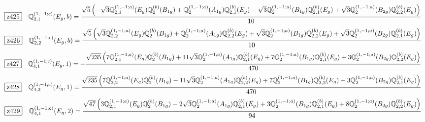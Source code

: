 \documentclass[fleqn,10pt,landscape]{jsarticle}
\begin{document}
\begin{dmath*}
\hspace*{3mm}\fbox{z425}\quad \mathbb{Q}_{2,1}^{(1,-1;c)}(E_{g},b)=\frac{\sqrt{5} \left(- \sqrt{3} \mathbb{Q}_{2,1}^{(1,-1;a)}(E_{g}) \mathbb{Q}_{2}^{(b)}(B_{1g}) + \mathbb{Q}_{2}^{(1,-1;a)}(A_{1g}) \mathbb{Q}_{2,1}^{(b)}(E_{g}) - \sqrt{3} \mathbb{Q}_{2}^{(1,-1;a)}(B_{1g}) \mathbb{Q}_{2,1}^{(b)}(E_{g}) + \sqrt{3} \mathbb{Q}_{2}^{(1,-1;a)}(B_{2g}) \mathbb{Q}_{2,2}^{(b)}(E_{g})\right)}{10}
\end{dmath*}
\begin{dmath*}
\hspace*{3mm}\fbox{z426}\quad \mathbb{Q}_{2,2}^{(1,-1;c)}(E_{g},b)=\frac{\sqrt{5} \left(\sqrt{3} \mathbb{Q}_{2,2}^{(1,-1;a)}(E_{g}) \mathbb{Q}_{2}^{(b)}(B_{1g}) + \mathbb{Q}_{2}^{(1,-1;a)}(A_{1g}) \mathbb{Q}_{2,2}^{(b)}(E_{g}) + \sqrt{3} \mathbb{Q}_{2}^{(1,-1;a)}(B_{1g}) \mathbb{Q}_{2,2}^{(b)}(E_{g}) + \sqrt{3} \mathbb{Q}_{2}^{(1,-1;a)}(B_{2g}) \mathbb{Q}_{2,1}^{(b)}(E_{g})\right)}{10}
\end{dmath*}
\begin{dmath*}
\hspace*{3mm}\fbox{z427}\quad \mathbb{Q}_{4,1}^{(1,-1;c)}(E_{g},1)=- \frac{\sqrt{235} \left(7 \mathbb{Q}_{2,1}^{(1,-1;a)}(E_{g}) \mathbb{Q}_{2}^{(b)}(B_{1g}) + 11 \sqrt{3} \mathbb{Q}_{2}^{(1,-1;a)}(A_{1g}) \mathbb{Q}_{2,1}^{(b)}(E_{g}) + 7 \mathbb{Q}_{2}^{(1,-1;a)}(B_{1g}) \mathbb{Q}_{2,1}^{(b)}(E_{g}) + 3 \mathbb{Q}_{2}^{(1,-1;a)}(B_{2g}) \mathbb{Q}_{2,2}^{(b)}(E_{g})\right)}{470}
\end{dmath*}
\begin{dmath*}
\hspace*{3mm}\fbox{z428}\quad \mathbb{Q}_{4,2}^{(1,-1;c)}(E_{g},1)=\frac{\sqrt{235} \left(7 \mathbb{Q}_{2,2}^{(1,-1;a)}(E_{g}) \mathbb{Q}_{2}^{(b)}(B_{1g}) - 11 \sqrt{3} \mathbb{Q}_{2}^{(1,-1;a)}(A_{1g}) \mathbb{Q}_{2,2}^{(b)}(E_{g}) + 7 \mathbb{Q}_{2}^{(1,-1;a)}(B_{1g}) \mathbb{Q}_{2,2}^{(b)}(E_{g}) - 3 \mathbb{Q}_{2}^{(1,-1;a)}(B_{2g}) \mathbb{Q}_{2,1}^{(b)}(E_{g})\right)}{470}
\end{dmath*}
\begin{dmath*}
\hspace*{3mm}\fbox{z429}\quad \mathbb{Q}_{4,1}^{(1,-1;c)}(E_{g},2)=\frac{\sqrt{47} \left(3 \mathbb{Q}_{2,1}^{(1,-1;a)}(E_{g}) \mathbb{Q}_{2}^{(b)}(B_{1g}) - 2 \sqrt{3} \mathbb{Q}_{2}^{(1,-1;a)}(A_{1g}) \mathbb{Q}_{2,1}^{(b)}(E_{g}) + 3 \mathbb{Q}_{2}^{(1,-1;a)}(B_{1g}) \mathbb{Q}_{2,1}^{(b)}(E_{g}) + 8 \mathbb{Q}_{2}^{(1,-1;a)}(B_{2g}) \mathbb{Q}_{2,2}^{(b)}(E_{g})\right)}{94}
\end{dmath*}
\end{document}
